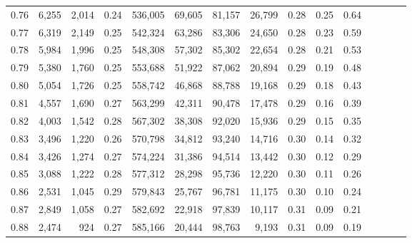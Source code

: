 \begin{tabular}{rrrcrrrrrrrrrrr}
0.76 &   6,255 &  2,014 &                                       0.24 &  536,005 &   69,605 &   81,157 &   26,799 &  0.28 &  0.25 &                         0.64 \\
0.77 &   6,319 &  2,149 &                                       0.25 &  542,324 &   63,286 &   83,306 &   24,650 &  0.28 &  0.23 &                         0.59 \\
0.78 &   5,984 &  1,996 &                                       0.25 &  548,308 &   57,302 &   85,302 &   22,654 &  0.28 &  0.21 &                         0.53 \\
0.79 &   5,380 &  1,760 &                                       0.25 &  553,688 &   51,922 &   87,062 &   20,894 &  0.29 &  0.19 &                         0.48 \\
0.80 &   5,054 &  1,726 &                                       0.25 &  558,742 &   46,868 &   88,788 &   19,168 &  0.29 &  0.18 &                         0.43 \\
0.81 &   4,557 &  1,690 &                                       0.27 &  563,299 &   42,311 &   90,478 &   17,478 &  0.29 &  0.16 &                         0.39 \\
0.82 &   4,003 &  1,542 &                                       0.28 &  567,302 &   38,308 &   92,020 &   15,936 &  0.29 &  0.15 &                         0.35 \\
0.83 &   3,496 &  1,220 &                                       0.26 &  570,798 &   34,812 &   93,240 &   14,716 &  0.30 &  0.14 &                         0.32 \\
0.84 &   3,426 &  1,274 &                                       0.27 &  574,224 &   31,386 &   94,514 &   13,442 &  0.30 &  0.12 &                         0.29 \\
0.85 &   3,088 &  1,222 &                                       0.28 &  577,312 &   28,298 &   95,736 &   12,220 &  0.30 &  0.11 &                         0.26 \\
0.86 &   2,531 &  1,045 &                                       0.29 &  579,843 &   25,767 &   96,781 &   11,175 &  0.30 &  0.10 &                         0.24 \\
0.87 &   2,849 &  1,058 &                                       0.27 &  582,692 &   22,918 &   97,839 &   10,117 &  0.31 &  0.09 &                         0.21 \\
0.88 &   2,474 &    924 &                                       0.27 &  585,166 &   20,444 &   98,763 &    9,193 &  0.31 &  0.09 &                         0.19 \\

\end{tabular}
